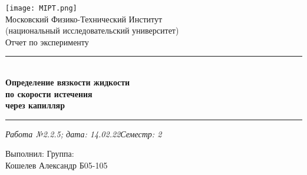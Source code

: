 \documentclass[12pt,a4paper]{scrartcl}
\begin{document}
	\graphicspath{{C:/Users/Alex/OneDrive/Изображения/TexImgs}}
	
	\newcommand{\ms}{\mathstrut}
	\newcommand{\msp}{\hspace{0.5cm}}
	\newcommand{\al}{\alpha}
	\newcommand{\dg}{^\circ}
	\newcommand{\qd}[2]{^{\frac{#1}{#2}}}
	\newcommand{\qdm}[2]{^{-\frac{#1}{#2}}}
	\newcommand{\lm}[2]{\underset{#1 \rightarrow #2}{\lim}}
	\newcommand{\sfrac}[2]{\dfrac{\strut #1}{\strut #2}}
	\newcommand{\equal}[1]{\overset{(#1)}{=}}
	\newcommand{\linevdots}{\ \raisebox{-.08\height}{\vdots}\ }
	\newcommand{\linecvdots}{\ \raisebox{-.08\height}{\vdots}\hspace{-0.13cm}\raisebox{.15\height}{\cancel{\phantom{a}}\hspace{0.06cm}}}
	\newcommand{\combox}[1]{\ms \msp \msp \begin{minipage}{0.95\linewidth}
			#1
	\end{minipage}}
	
	\newtheorem{pr}{Задача}
	\newtheorem{ex}{Пример}
	\newtheorem{dfn}{Def}
	\newtheorem{theorem}{Th}
	
	\newenvironment{slv}{\ms \msp \textit{Решение:}}{}
	\newenvironment{proof}{\ms \msp \textit{Доказательство: }}{\hfill $\square$}
	
	\begin{titlepage}
		
		\vspace*{\fill}
		
		\begin{center}
			\texttt{[image: MIPT.png]}
			\\[0.7cm]\Huge Московский Физико-Технический Институт\\(национальный исследовательский университет)
			\\[2cm]\LARGE Отчет по эксперименту
			\\[0.5cm]\noindent\rule{\textwidth}{1pt}
			\\\Huge\textbf{Определение вязкости жидкости\\по скорости истечения\\через капилляр}
			\\[-0.5cm]\noindent\rule{\textwidth}{1pt}
		\end{center}
		
		\begin{flushleft}
			\textit{Работа №2.2.5; дата: 14.02.22}\hfill\textit{Семестр: 2}
		\end{flushleft}
		
		\vspace*{\fill}
		
		\begin{flushleft}
			Выполнил: \hspace{\fill} Группа:
			\\Кошелев Александр \hspace{\fill} Б05-105
		\end{flushleft}
	\end{titlepage}
	
\end{document}
